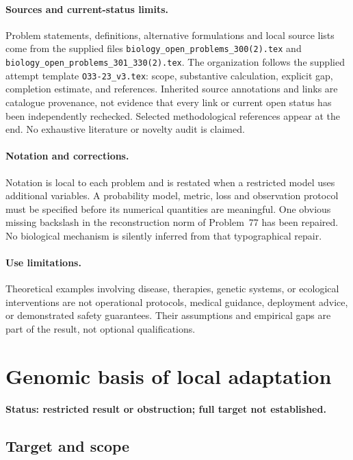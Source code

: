 \documentclass[11pt]{article}
\begin{document}
\paragraph{Sources and current-status limits.}
Problem statements, definitions, alternative formulations and local source lists
come from the supplied files
\texttt{biology\_open\_problems\_300(2).tex} and
\texttt{biology\_open\_problems\_301\_330(2).tex}.
The organization follows the supplied attempt template
\texttt{O33-23\_v3.tex}: scope, substantive calculation, explicit gap,
completion estimate, and references. Inherited source annotations and links are
catalogue provenance, not evidence that every link or current open status has
been independently rechecked. Selected methodological references appear at the
end. No exhaustive literature or novelty audit is claimed.

\paragraph{Notation and corrections.}
Notation is local to each problem and is restated when a restricted model uses
additional variables. A probability model, metric, loss and observation protocol
must be specified before its numerical quantities are meaningful. One obvious
missing backslash in the reconstruction norm of Problem~77 has been repaired.
No biological mechanism is silently inferred from that typographical repair.

\paragraph{Use limitations.}
Theoretical examples involving disease, therapies, genetic systems, or ecological
interventions are not operational protocols, medical guidance, deployment advice,
or demonstrated safety guarantees. Their assumptions and empirical gaps are part
of the result, not optional qualifications.


\section*{Genomic basis of local adaptation}
\label{prob:172}
\noindent\textbf{Status: restricted result or obstruction; full target not established.}
\subsection{Target and scope}
\end{document}
